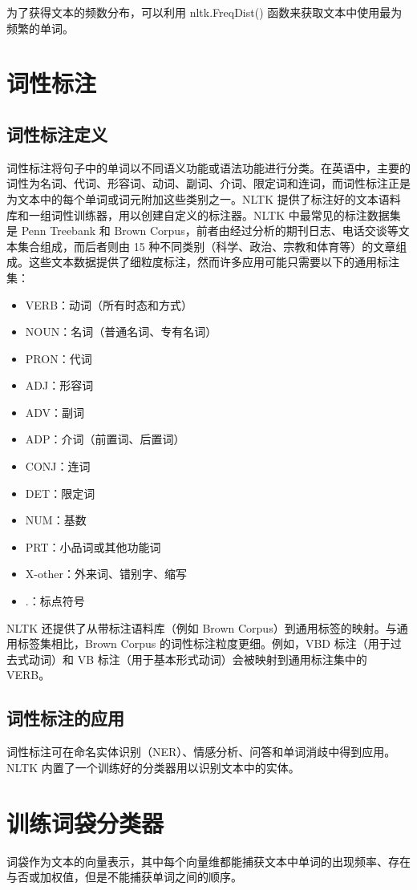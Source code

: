为了获得文本的频数分布，可以利用 nltk.FreqDist() 函数来获取文本中使用最为频繁的单词。
\section{词性标注}
\subsection{词性标注定义}
词性标注将句子中的单词以不同语义功能或语法功能进行分类。在英语中，主要的词性为名词、代词、形容词、动词、副词、介词、限定词和连词，而词性标注正是为文本中的每个单词或词元附加这些类别之一。NLTK 提供了标注好的文本语料库和一组词性训练器，用以创建自定义的标注器。NLTK 中最常见的标注数据集是 Penn Treebank 和 Brown Corpus，前者由经过分析的期刊日志、电话交谈等文本集合组成，而后者则由 15 种不同类别（科学、政治、宗教和体育等）的文章组成。这些文本数据提供了细粒度标注，然而许多应用可能只需要以下的通用标注集：
\begin{itemize}
    \item VERB：动词（所有时态和方式）
    \item NOUN：名词（普通名词、专有名词）
    \item PRON：代词
    \item ADJ：形容词
    \item ADV：副词
    \item ADP：介词（前置词、后置词）
    \item CONJ：连词
    \item DET：限定词
    \item NUM：基数
    \item PRT：小品词或其他功能词
    \item X-other：外来词、错别字、缩写
    \item .：标点符号
\end{itemize}
NLTK 还提供了从带标注语料库（例如 Brown Corpus）到通用标签的映射。与通用标签集相比，Brown Corpus 的词性标注粒度更细。例如，VBD 标注（用于过去式动词）和 VB 标注（用于基本形式动词）会被映射到通用标注集中的 VERB。
\subsection{词性标注的应用}
词性标注可在命名实体识别（NER）、情感分析、问答和单词消歧中得到应用。NLTK 内置了一个训练好的分类器用以识别文本中的实体。
\section{训练词袋分类器}
词袋作为文本的向量表示，其中每个向量维都能捕获文本中单词的出现频率、存在与否或加权值，但是不能捕获单词之间的顺序。